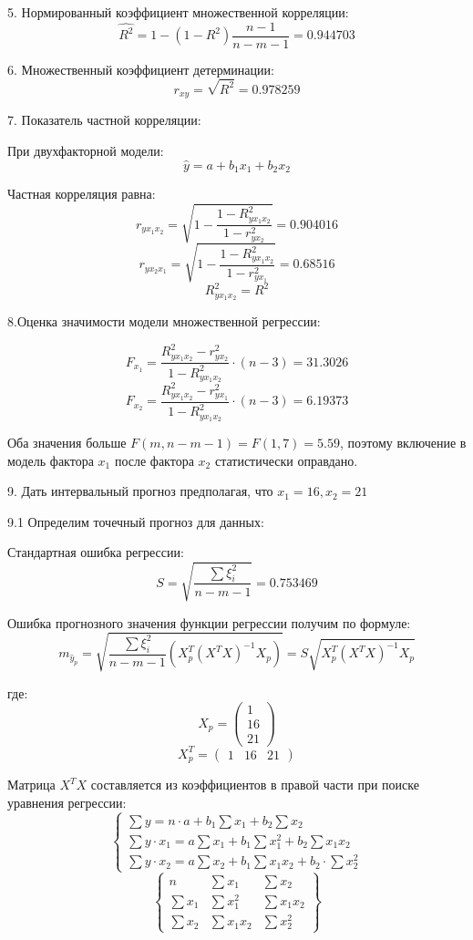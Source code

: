 \documentclass[aps,%
12pt,%
final,%
oneside,
onecolumn,%
musixtex, %
superscriptaddress,%
centertags]{article} %
\begin{document}
5. Нормированный коэффициент множественной корреляции:
$$ \hat{R^2} = 1 -(1-R^2) \frac{n-1}{n-m-1} = 0.944703 $$

6. Множественный коэффициент детерминации:
$$ r_{xy} = \sqrt {R^2} = 0.978259$$

7. Показатель частной корреляции:

При двухфакторной модели:
$$ \hat{y} = a +b_1x_1 + b_2x_2$$

Частная корреляция равна:
$$ r_{yx_1x_2} = \sqrt{1 - \frac{1 - R_{yx_1x_2}^2}{1-r_{yx_2}^2}} = 0.904016$$
$$ r_{yx_2x_1} = \sqrt{1 - \frac{1 - R_{yx_1x_2}^2}{1-r_{yx_1}^2}} = 0.68516$$
$$ R_{yx_1x_2}^2 = R^2 $$

8.Оценка значимости модели множественной регрессии:

$$F_{x_1} = \frac{R_{yx_1x_2}^2 - r_{yx_2}^2}{1-R_{yx_1x_2}^2} \cdot (n-3) = 31.3026$$
$$F_{x_2} = \frac{R_{yx_1x_2}^2 - r_{yx_1}^2}{1-R_{yx_1x_2}^2} \cdot (n-3) = 6.19373$$

Оба значения больше $F(m,n-m-1) = F(1,7) = 5.59$, поэтому включение в модель фактора $x_1$ после фактора $x_2$ статистически оправдано. 

9. Дать интервальный прогноз предполагая, что $x_1 = 16, x_2 = 21$

9.1 Определим точечный прогноз для данных:

Стандартная ошибка регрессии:
$$S =\sqrt{\frac{\sum \xi_i^2}{n-m-1}} = 0.753469$$

Ошибка прогнозного значения функции регрессии получим по формуле:
$$m_{\hat{y}_p}  = \sqrt{\frac{\sum \xi_i^2}{n-m-1} (X_p^T(X^T X)^{-1}X_p)} = S  \sqrt {X_p^T(X^T X)^{-1}X_p}$$

где:
$$X_p = 
\begin{pmatrix}
	1  \\
	16 \\
	21 
\end{pmatrix}$$
$$X_p^{T} = 
\begin{pmatrix}
	1 & 16 & 21
\end{pmatrix}$$

Матрица $X^TX$ составляется из коэффициентов в правой части при поиске уравнения регрессии:
$$\left \{
\begin{matrix}
	\sum y = n \cdot a + b_1 \sum x_1 + b_2 \sum x_2 \\[0.3cm]
	\sum y \cdot x_1 = a \sum x_1 + b_1 \sum x_1^2 + b_2 \sum x_1x_2\\[0.3cm]
	\sum y \cdot x_2 = a\sum x_2 + b_1 \sum x_1x_2 + b_2 \cdot \sum x_2^2
\end{matrix}
\right.
$$
$$\left \{
\begin{matrix}
	n & \sum x_1 & \sum x_2 \\[0.3cm]
	\sum x_1 & \sum x_1^2 & \sum x_1x_2 \\[0.3cm]
	\sum x_2 & \sum x_1x_2 & \sum x_2^2
\end{matrix}
\right \}$$
\end{document}
